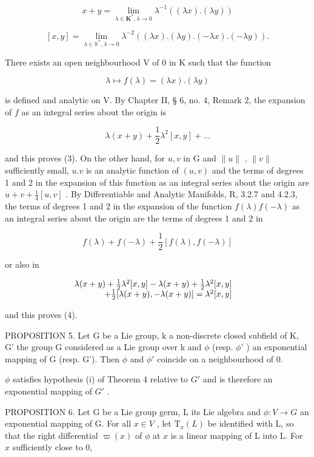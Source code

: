 \[
x + y = \lim _ {\lambda \in \mathbf {K} ^ {*}, \lambda \rightarrow 0} \lambda^ {- 1} ((\lambda x). (\lambda y))\tag{3}
\]

\[
[ x, y ] = \lim _ {\lambda \in \mathbb {K} ^ {*}, \lambda \rightarrow 0} \lambda^ {- 2} ((\lambda x). (\lambda y). (- \lambda x). (- \lambda y)).\tag{4}
\]

There exists an open neighbourhood V of 0 in K such that the function

\[
\lambda \mapsto f (\lambda) = (\lambda x). (\lambda y)
\]

is defined and analytic on V. By Chapter II, § 6, no. 4, Remark 2, the expansion of \(f\) as an integral series about the origin is

\[
\lambda (x + y) + \frac {1}{2} \lambda^ {2} [ x, y ] + \dots
\]

and this proves (3). On the other hand, for \(u, v\) in G and \(\| u \|\) , \(\| v \|\) sufficiently small, \(u.v\) is an analytic function of \((u, v)\) and the terms of degrees 1 and 2 in the expansion of this function as an integral series about the origin are \(u + v + \frac{1}{4}[u, v]\) . By Differentiable and Analytic Manifolds, R, 3.2.7 and 4.2.3, the terms of degrees 1 and 2 in the expansion of the function \(f(\lambda)f(-\lambda)\) as an integral series about the origin are the terms of degrees 1 and 2 in

\[
f (\lambda) + f (- \lambda) + \frac {1}{2} [ f (\lambda), f (- \lambda) ]
\]

or also in

\[
\begin{array}{r l} \lambda (x + y) + \frac {1}{2} \lambda^ {2} [ x, y ] - \lambda (x + y) + \frac {1}{2} \lambda^ {2} [ x, y ] & \\ + \frac {1}{2} [ \lambda (x + y), - \lambda (x + y) ] = \lambda^ {2} [ x, y ] \end{array}
\]

and this proves (4).

PROPOSITION 5. Let G be a Lie group, k a non-discrete closed subfield of K, G' the group G considered as a Lie group over k and \(\phi\) (resp. \(\phi'\) ) an exponential mapping of G (resp. G'). Then \(\phi\) and \(\phi'\) coincide on a neighbourhood of 0.

\(\phi\) satisfies hypothesis (i) of Theorem 4 relative to \(G'\) and is therefore an exponential mapping of \(G'\) .

PROPOSITION 6. Let G be a Lie group germ, L its Lie algebra and \(\phi: V \to G\) an exponential mapping of G. For all \(x \in V\) , let \(\mathrm{T}_x(L)\) be identified with L, so that the right differential \(\varpi(x)\) of \(\phi\) at \(x\) is a linear mapping of L into L. For \(x\) sufficiently close to 0,

